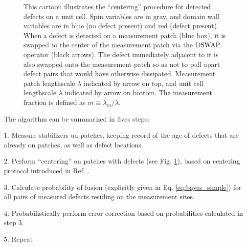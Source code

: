\documentclass[twocolumn,superscriptaddress,aps,prb,floatfix]{revtex4-1}
\newcommand{\figref}[1]{Fig. \ref{#1}}
\newcommand{\MS}[1]{{\color{mauve} {#1}}}
\begin{document}
\begin{figure}
\begin{center}
\end{center}
\caption{This cartoon illustrates the ``centering'' procedure for detected defects on a unit cell.  Spin variables are in gray, and domain wall variables are in blue (no defect present) and red (defect present).  When a defect is detected on a measurement patch (blue box), it is swapped to the center of the measurement patch via the $\rm{DSWAP}$ operator (black arrows).  The defect immediately adjacent to it is also swapped onto the measurement patch so as not to pull apart defect pairs that would have otherwise dissipated.  Measurement patch lengthscale $\lambda$ indicated by arrow on top, and unit cell lengthscale $\lambda$ indicated by arrow on bottom. \MS{The measurement fraction is defined as $m\equiv \lambda_m/\lambda$.}}
\label{fig:detect_swap}
\end{figure}

The algorithm can be summarized in fives steps:

1. Measure stabilizers on patches, keeping record of the age of defects that are already on patches, as well as defect locations.  

2. Perform ``centering'' on patches with defects (see \figref{fig:detect_swap}), based on centering protocol introduced in Ref. \cite{Freeman2016}.

3. Calculate probability of fusion (explicitly given in Eq. \ref{eq:bayes_simple}) for all pairs of measured defects residing on the measurement sites.

4. Probabilistically perform error correction based on probabilities calculated in step 3.

5. Repeat
\end{document}
